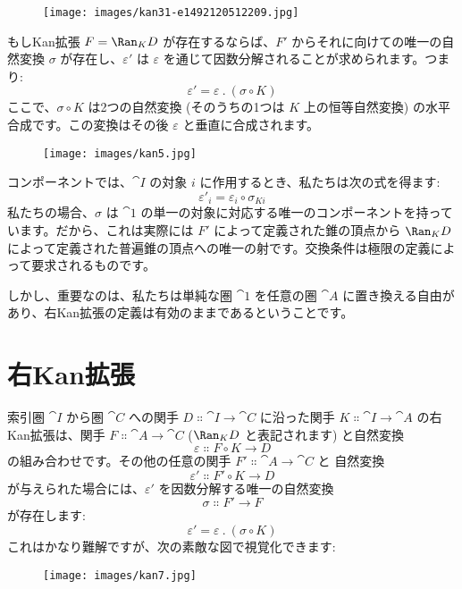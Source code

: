 \begin{figure}[H]
  \centering
  \texttt{[image: images/kan31-e1492120512209.jpg]}
\end{figure}

\noindent
もしKan拡張 $F = \Ran_{K}D$ が存在するならば、$F'$ からそれに向けての唯一の自然変換 $\sigma$ が存在し、$\varepsilon'$ は $\varepsilon$ を通じて因数分解されることが求められます。つまり:
\[\varepsilon' = \varepsilon\ .\ (\sigma \circ K)\]
ここで、$\sigma \circ K$ は2つの自然変換 (そのうちの1つは $K$ 上の恒等自然変換) の水平合成です。この変換はその後 $\varepsilon$ と垂直に合成されます。

\begin{figure}[H]
  \centering
  \texttt{[image: images/kan5.jpg]}
\end{figure}

\noindent
コンポーネントでは、$\cat{I}$ の対象 $i$ に作用するとき、私たちは次の式を得ます:
\[\varepsilon'_i = \varepsilon_i \circ \sigma_{K i}\]
私たちの場合、$\sigma$ は $\cat{1}$ の単一の対象に対応する唯一のコンポーネントを持っています。だから、これは実際には $F'$ によって定義された錐の頂点から $\Ran_{K}D$ によって定義された普遍錐の頂点への唯一の射です。交換条件は極限の定義によって要求されるものです。

しかし、重要なのは、私たちは単純な圏 $\cat{1}$ を任意の圏 $\cat{A}$ に置き換える自由があり、右Kan拡張の定義は有効のままであるということです。

\section{右Kan拡張}

索引圏 $\cat{I}$ から圏 $\cat{C}$ への関手 $D \Colon \cat{I} \to \cat{C}$ に沿った関手 $K \Colon \cat{I} \to \cat{A}$ の右Kan拡張は、関手 $F \Colon \cat{A} \to \cat{C}$  ($\Ran_{K}D$ と表記されます) と自然変換
\[\varepsilon \Colon F \circ K \to D\]
の組み合わせです。その他の任意の関手 $F' \Colon \cat{A} \to \cat{C}$ と
自然変換
\[\varepsilon' \Colon F' \circ K \to D\]
が与えられた場合には、$\varepsilon'$ を因数分解する唯一の自然変換
\[\sigma \Colon F' \to F\]
が存在します:
\[\varepsilon' = \varepsilon\ .\ (\sigma \circ K)\]
これはかなり難解ですが、次の素敵な図で視覚化できます:

\begin{figure}[H]
  \centering
  \texttt{[image: images/kan7.jpg]}
\end{figure}

